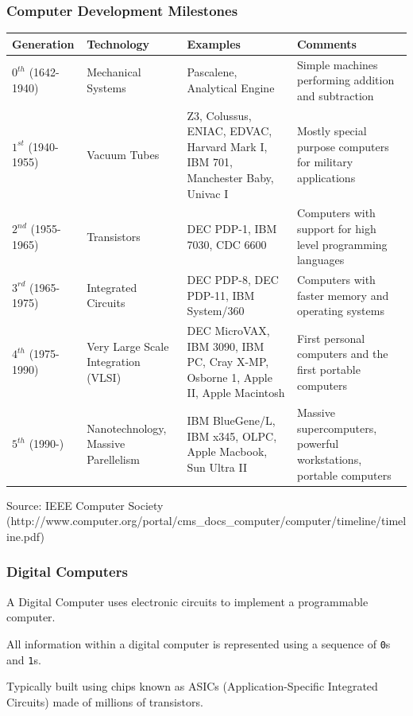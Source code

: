 \begin{frame}
\frametitle{Computer Development Milestones}
{\tiny
\begin{center}
\begin{tabular}{|p{1cm}|p{2cm}|p{3cm}|p{3.5cm}|}
	\hline
	\textbf{Generation} & \textbf{Technology} & \textbf{Examples} & \textbf{Comments}\\ \hline 
	$0^{th}$ \mbox{(1642-1940)} & Mechanical Systems & Pascalene, Analytical Engine & Simple machines performing addition and subtraction \\\hline
	$1^{st}$ \mbox{(1940-1955)} & Vacuum Tubes & Z3, Colussus, ENIAC, EDVAC, Harvard Mark I, IBM 701, Manchester Baby, Univac I & Mostly special purpose computers for military applications \\\hline
	$2^{nd}$ \mbox{(1955-1965)} & Transistors & DEC PDP-1, IBM 7030, CDC 6600 & Computers with support for high level programming languages \\\hline
	$3^{rd}$ \mbox{(1965-1975)} & Integrated Circuits & DEC PDP-8, DEC PDP-11, IBM System/360 & Computers with faster memory and operating systems \\\hline
	$4^{th}$ \mbox{(1975-1990)} & Very Large Scale Integration (VLSI) & DEC MicroVAX, IBM 3090, IBM PC, Cray X-MP, Osborne 1, Apple II, Apple Macintosh & First personal computers and the first portable computers \\\hline
	$5^{th}$ \mbox{(1990-)} & Nanotechnology, Massive Parellelism & IBM BlueGene/L, IBM x345, OLPC, Apple Macbook, Sun Ultra II & Massive supercomputers, powerful workstations, portable computers \\\hline
	
\end{tabular}

\tiny{Source: IEEE Computer Society (http://www.computer.org/portal/cms\_docs\_computer/computer/timeline/timeline.pdf)}

\end{center}
}

\end{frame}

\begin{frame}
\frametitle{Digital Computers}
A \alert{Digital Computer} uses electronic circuits to implement a programmable computer.

All information within a digital computer is represented using a sequence of \texttt{0}s and \texttt{1}s.

Typically built using chips known as ASICs (Application-Specific Integrated Circuits) made of millions of transistors.

\end{frame}

